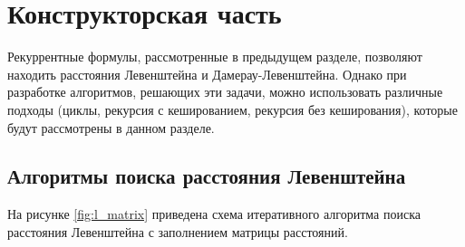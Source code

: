 \chapter{Конструкторская часть}

Рекуррентные формулы, рассмотренные в предыдущем разделе, позволяют находить расстояния Левенштейна и Дамерау-Левенштейна. Однако при разработке алгоритмов, решающих эти задачи, можно использовать различные подходы (циклы, рекурсия с кешированием, рекурсия без кеширования), которые будут рассмотрены в данном разделе.
\newpage
\section{Алгоритмы поиска расстояния Левенштейна}

На рисунке \ref{fig:l_matrix} приведена схема итеративного алгоритма поиска расстояния Левенштейна с заполнением матрицы расстояний.


